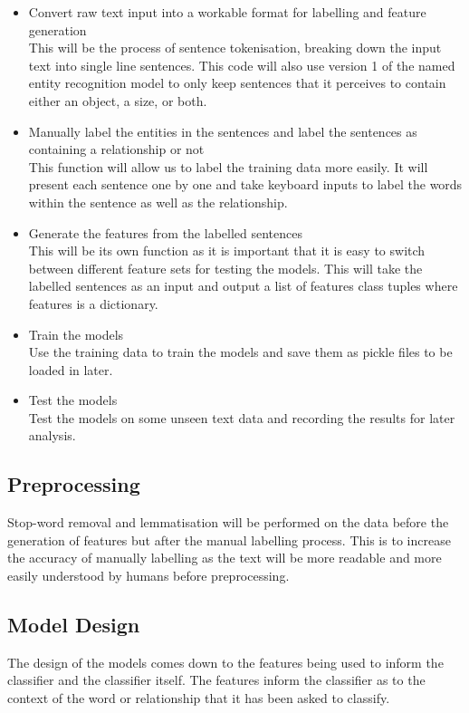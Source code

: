 \documentclass[11pt,oneside]{book}
\begin{document}
\begin{itemize}
\item Convert raw text input into a workable format for labelling and feature generation \\
This will be the process of sentence tokenisation, breaking down the input text into single line sentences. This code will also use version 1 of the named entity recognition model to only keep sentences that it perceives to contain either an object, a size, or both.
\item Manually label the entities in the sentences and label the sentences as containing a relationship or not \\
This function will allow us to label the training data more easily. It will present each sentence one by one and take keyboard inputs to label the words within the sentence as well as the relationship.
\item Generate the features from the labelled sentences \\
This will be its own function as it is important that it is easy to switch between different feature sets for testing the models. This will take the labelled sentences as an input and output a list of features class tuples where features is a dictionary.
\item Train the models \\
Use the training data to train the models and save them as pickle files to be loaded in later.
\item Test the models \\
Test the models on some unseen text data and recording the results for later analysis.
\end{itemize}

\subsection{Preprocessing}
Stop-word removal and lemmatisation will be performed on the data before the generation of features but after the manual labelling process. This is to increase the accuracy of manually labelling as the text will be more readable and more easily understood by humans before preprocessing.  

\subsection{Model Design}
The design of the models comes down to the features being used to inform the classifier and the classifier itself. The features inform the classifier as to the context of the word or relationship that it has been asked to classify.
\end{document}

